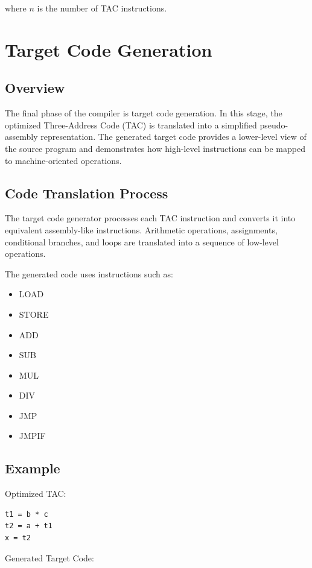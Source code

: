 \documentclass[12pt,a4paper]{report}
\begin{document}
where \(n\) is the number of TAC instructions.

\chapter{Target Code Generation}

\section{Overview}

The final phase of the compiler is target code generation. In this stage, the optimized Three-Address Code (TAC) is translated into a simplified pseudo-assembly representation. The generated target code provides a lower-level view of the source program and demonstrates how high-level instructions can be mapped to machine-oriented operations.

\section{Code Translation Process}

The target code generator processes each TAC instruction and converts it into equivalent assembly-like instructions. Arithmetic operations, assignments, conditional branches, and loops are translated into a sequence of low-level operations.

The generated code uses instructions such as:

\begin{itemize}
    \item LOAD
    \item STORE
    \item ADD
    \item SUB
    \item MUL
    \item DIV
    \item JMP
    \item JMPIF
\end{itemize}

\section{Example}

Optimized TAC:

\begin{lstlisting}
t1 = b * c
t2 = a + t1
x = t2
\end{lstlisting}

Generated Target Code:
\end{document}

